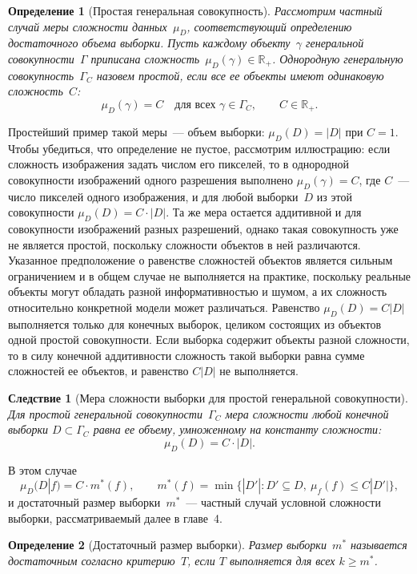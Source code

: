 \documentclass{dissert}
\newtheorem{definition}{Определение}
\newtheorem{corollary}[theorem]{Следствие}
\begin{document}
\begin{definition}[Простая генеральная совокупность]
Рассмотрим частный случай меры сложности данных~$\mu_D$, соответствующий определению достаточного объема выборки. Пусть каждому объекту~$\gamma$ генеральной совокупности~$\Gamma$ приписана сложность~$\mu_D(\gamma)\in\mathbb{R}_+$. Однородную генеральную совокупность~$\Gamma_C$ назовем \textit{простой}, если все ее объекты имеют одинаковую сложность~$C$:
\[
    \mu_D(\gamma)=C \quad \text{для всех } \gamma\in\Gamma_C, \qquad C\in\mathbb{R}_+.
\]
\end{definition}
Простейший пример такой меры~--- объем выборки: $\mu_D(D)=|D|$ при $C=1$. Чтобы убедиться, что определение не пустое, рассмотрим иллюстрацию: если сложность изображения задать числом его пикселей, то в однородной совокупности изображений одного разрешения выполнено $\mu_D(\gamma)=C$, где $C$~--- число пикселей одного изображения, и для любой выборки~$D$ из этой совокупности $\mu_D(D)=C\cdot|D|$. Та же мера остается аддитивной и для совокупности изображений разных разрешений, однако такая совокупность уже не является простой, поскольку сложности объектов в ней различаются.
Указанное предположение о равенстве сложностей объектов является сильным ограничением и в общем случае не выполняется на практике, поскольку реальные объекты могут обладать разной информативностью и шумом, а их сложность относительно конкретной модели может различаться. Равенство $\mu_D(D)=C|D|$ выполняется только для конечных выборок, целиком состоящих из объектов одной простой совокупности. Если выборка содержит объекты разной сложности, то в силу конечной аддитивности сложность такой выборки равна сумме сложностей ее объектов, и равенство $C|D|$ не выполняется.
\begin{corollary}[Мера сложности выборки для простой генеральной совокупности]
Для простой генеральной совокупности~$\Gamma_C$ мера сложности любой конечной выборки $D \subset \Gamma_C$ равна ее объему, умноженному на константу сложности:
\[
    \mu_D(D)=C\cdot|D|.
\]
\end{corollary}
В этом случае
\[
    \mu_D(D|f)=C\cdot m^*(f),\qquad
    m^*(f)=\min\bigl\{|D'|: D'\subseteq D,\ \mu_f(f)\le C|D'|\bigr\},
\]
и достаточный размер выборки~$m^*$~--- частный случай условной сложности выборки, рассматриваемый далее в главе~4.

\begin{definition}[Достаточный размер выборки]
Размер выборки~$m^*$ называется \textit{достаточным} согласно критерию~$T$, если $T$ выполняется для всех $k \geqslant m^*$.
\end{definition}
\end{document}
